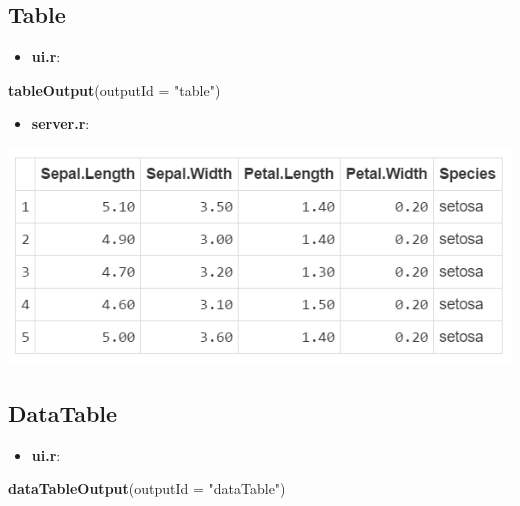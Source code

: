 \documentclass[]{article}
\newenvironment{Shaded}{\begin{snugshade}}{\end{snugshade}}
\newcommand{\KeywordTok}[1]{\textcolor[rgb]{0.13,0.29,0.53}{\textbf{#1}}}
\newcommand{\DataTypeTok}[1]{\textcolor[rgb]{0.13,0.29,0.53}{#1}}
\newcommand{\StringTok}[1]{\textcolor[rgb]{0.31,0.60,0.02}{#1}}
\newcommand{\OperatorTok}[1]{\textcolor[rgb]{0.81,0.36,0.00}{\textbf{#1}}}
\newcommand{\NormalTok}[1]{#1}
\providecommand{\tightlist}{%
  \setlength{\itemsep}{0pt}\setlength{\parskip}{0pt}}
\begin{document}
\subsection{Table}\label{table}

\begin{itemize}
\tightlist
\item
  \textbf{ui.r}:
\end{itemize}

\begin{Shaded}
\begin{Highlighting}[]
\KeywordTok{tableOutput}\NormalTok{(}\DataTypeTok{outputId =} \StringTok{"table"}\NormalTok{)}
\end{Highlighting}
\end{Shaded}

\begin{itemize}
\tightlist
\item
  \textbf{server.r}:
\end{itemize}

\begin{Shaded}
\end{Shaded}

\includegraphics{img/otable.png}

\subsection{DataTable}\label{datatable}

\begin{itemize}
\tightlist
\item
  \textbf{ui.r}:
\end{itemize}

\begin{Shaded}
\begin{Highlighting}[]
\KeywordTok{dataTableOutput}\NormalTok{(}\DataTypeTok{outputId =} \StringTok{"dataTable"}\NormalTok{)}
\end{Highlighting}
\end{Shaded}
\end{document}
